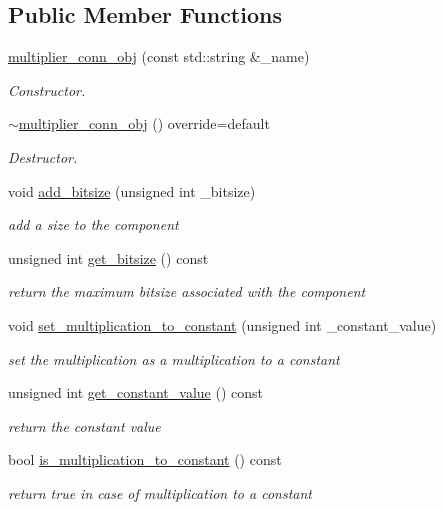 \subsection*{Public Member Functions}
\begin{DoxyCompactItemize}
\item 
\hyperlink{classmultiplier__conn__obj_a2a8dd975d60b62c0d5edb3ff408608ef}{multiplier\+\_\+conn\+\_\+obj} (const std\+::string \&\+\_\+name)
\begin{DoxyCompactList}\small\item\em Constructor. \end{DoxyCompactList}\item 
\hyperlink{classmultiplier__conn__obj_a8cad7eb5d13aea13f8b82610713f996d}{$\sim$multiplier\+\_\+conn\+\_\+obj} () override=default
\begin{DoxyCompactList}\small\item\em Destructor. \end{DoxyCompactList}\item 
void \hyperlink{classmultiplier__conn__obj_a9ce8bf9aa33ae8b2a47df6bde3f122e7}{add\+\_\+bitsize} (unsigned int \+\_\+bitsize)
\begin{DoxyCompactList}\small\item\em add a size to the component \end{DoxyCompactList}\item 
unsigned int \hyperlink{classmultiplier__conn__obj_a6d31a08d7accc710bc980f085af5ffa8}{get\+\_\+bitsize} () const
\begin{DoxyCompactList}\small\item\em return the maximum bitsize associated with the component \end{DoxyCompactList}\item 
void \hyperlink{classmultiplier__conn__obj_ac7a35e042e44540509771cd1d1a7842a}{set\+\_\+multiplication\+\_\+to\+\_\+constant} (unsigned int \+\_\+constant\+\_\+value)
\begin{DoxyCompactList}\small\item\em set the multiplication as a multiplication to a constant \end{DoxyCompactList}\item 
unsigned int \hyperlink{classmultiplier__conn__obj_a5154bb990696cc092764c9434c66d446}{get\+\_\+constant\+\_\+value} () const
\begin{DoxyCompactList}\small\item\em return the constant value \end{DoxyCompactList}\item 
bool \hyperlink{classmultiplier__conn__obj_a1aab6e4ac04b1f89ff72009773de04de}{is\+\_\+multiplication\+\_\+to\+\_\+constant} () const
\begin{DoxyCompactList}\small\item\em return true in case of multiplication to a constant \end{DoxyCompactList}\end{DoxyCompactItemize}
